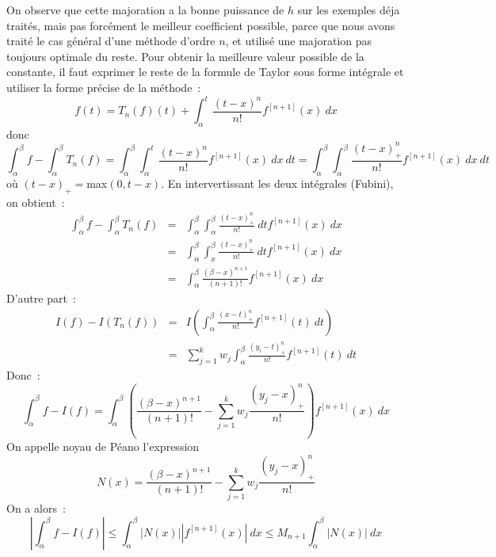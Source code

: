 \documentclass[a4paper,11pt]{article}
\begin{document}
On observe que cette majoration a la bonne puissance de $h$ sur
les exemples déja traités, mais pas forcément le meilleur coefficient
possible, parce que nous avons trait\'e le cas g\'en\'eral d'une
m\'ethode d'ordre $n$, et utilis\'e une majoration pas toujours
optimale du reste. Pour obtenir la meilleure valeur possible de la
constante, il faut exprimer le reste de la formule de Taylor sous
forme int\'egrale et utiliser la forme pr\'ecise de la m\'ethode~:
$$ f(t)=T_n(f)(t)+\int_\alpha^t \frac{(t-x)^n}{n!} f^{[n+1]}(x) \
dx $$
donc
$$ \int_{\alpha}^{\beta} f- \int_{\alpha}^{\beta} T_{n}(f)
= \int_{\alpha}^{\beta} \int_\alpha^t\frac{(t-x)^{n}}{n!} 
f^{[n+1]}(x) \ dx \ dt
= \int_{\alpha}^{\beta} \int_\alpha^\beta \frac{(t-x)_+^{n}}{n!} 
f^{[n+1]}(x) \ dx \ dt
$$
o\`u $(t-x)_+=$max$(0,t-x)$. En intervertissant les deux int\'egrales
(Fubini), on obtient~:
\begin{eqnarray*} \int_{\alpha}^{\beta} f- \int_{\alpha}^{\beta} T_{n}(f)
&=& \int_{\alpha}^{\beta} \int_\alpha^\beta \frac{(t-x)_+^{n}}{n!} 
\ dt f^{[n+1]}(x) \ dx \\
&=& \int_{\alpha}^{\beta} \int_x^\beta \frac{(t-x)_+^{n}}{n!} \ dt 
f^{[n+1]}(x) \ dx\\
&=& \int_{\alpha}^{\beta} \frac{(\beta-x)^{n+1}}{(n+1)!} f^{[n+1]}(x) \ dx
\end{eqnarray*}
D'autre part~:
\begin{eqnarray*} I(f)-I(T_n(f)) &=&
I\left( \int_\alpha^\beta \frac{(x-t)_+^{n}}{n!}  f^{[n+1]}(t) \ dt 
  \right) \\
& = &  \sum_{j=1}^k w_j 
\int_\alpha^\beta \frac{(y_i-t)_+^{n}}{n!} f^{[n+1]}(t) \ dt 
\end{eqnarray*}
Donc~:
$$ \int_{\alpha}^{\beta} f-I(f)
= \int_{\alpha}^{\beta} 
( \frac{(\beta-x)^{n+1}}{(n+1)!} -  \sum_{j=1}^k w_j \frac{(y_j-x)_+^{n}}{n!})
f^{[n+1]}(x) \ dx
$$
On appelle noyau de P\'eano l'expression
$$ N(x)=\frac{(\beta-x)^{n+1}}{(n+1)!} -  \sum_{j=1}^k w_j
\frac{(y_j-x)_+^{n}}{n!}$$
On a alors~:
$$ |\int_{\alpha}^{\beta} f-I(f)|
\leq \int_{\alpha}^{\beta} |N(x)| |f^{[n+1]}(x)| \ dx
\leq M_{n+1} \int_{\alpha}^{\beta} |N(x)| \ dx$$
\end{document}

